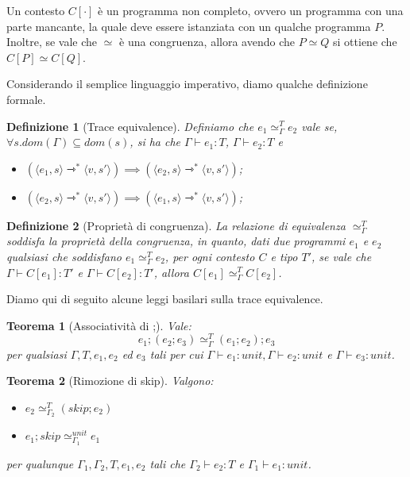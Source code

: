 \documentclass[a4paper, 11pt]{article}
\newtheorem{thm}{Teorema}[section]
\newtheorem{definit}{Definizione}[section]
\newcommand{\type}{\Gamma \vdash}
\newcommand{\goesto}{\rightarrowtriangle}
\newcommand{\treq}{\simeq_\Gamma^T}
\begin{document}
Un contesto $C\left[\cdot\right]$ è un programma non completo, ovvero un programma con una parte mancante, la quale deve essere istanziata con un qualche programma $P$. Inoltre, se vale che $\simeq$ è una congruenza, allora avendo che $P \simeq Q$ si ottiene che $C\left[P\right] \simeq C\left[Q\right]$.

Considerando il semplice linguaggio imperativo, diamo qualche definizione formale.

\begin{definit}[Trace equivalence]
	Definiamo che $e_1 \treq e_2$ vale se, $\forall s. dom(\Gamma) \subseteq dom(s)$, si ha che $\type e_1:T$, $\type e_2:T$ e \begin{itemize}
		\item $(\langle e_1, s \rangle \goesto^\ast \langle v, s' \rangle) \implies (\langle e_2, s \rangle \goesto^\ast \langle v, s' \rangle )$;
		\item $(\langle e_2, s \rangle \goesto^\ast \langle v, s' \rangle) \implies (\langle e_1, s \rangle \goesto^\ast \langle v, s' \rangle )$;
	\end{itemize}
\end{definit}

\begin{definit}[Proprietà di congruenza]
	La relazione di equivalenza $\treq$ soddisfa la proprietà della congruenza, in quanto, dati due programmi $e_1$ e $e_2$ qualsiasi che soddisfano $e_1 \treq e_2$, per ogni contesto $C$ e tipo $T'$, se vale che $\type C\left[e_1\right]:T'$ e $\type C\left[e_2\right]:T'$, allora $C\left[e_1\right] \treq C\left[e_2\right]$.
\end{definit}

Diamo qui di seguito alcune leggi basilari sulla trace equivalence.

\begin{thm}[Associatività di ;] Vale:
	\[ e_1;(e_2; e_3) \treq (e_1; e_2);e_3 \] per qualsiasi $\Gamma, T, e_1, e_2$ ed $e_3$ tali per cui $\type e_1:unit, \type e_2:unit$ e $\type e_3:unit$.
\end{thm} \newpage

\begin{thm}[Rimozione di skip] Valgono:
	\begin{itemize}
		\item $e_2 \simeq_{\Gamma_2}^T (skip;e_2)$
		\item $e_1;skip \simeq_{\Gamma_1}^{unit} e_1$
	\end{itemize}
	per qualunque $\Gamma_1, \Gamma_2, T, e_1, e_2$ tali che $\Gamma_2 \vdash e_2:T$ e $\Gamma_1 \vdash e_1:unit$.
\end{thm}
\end{document}
